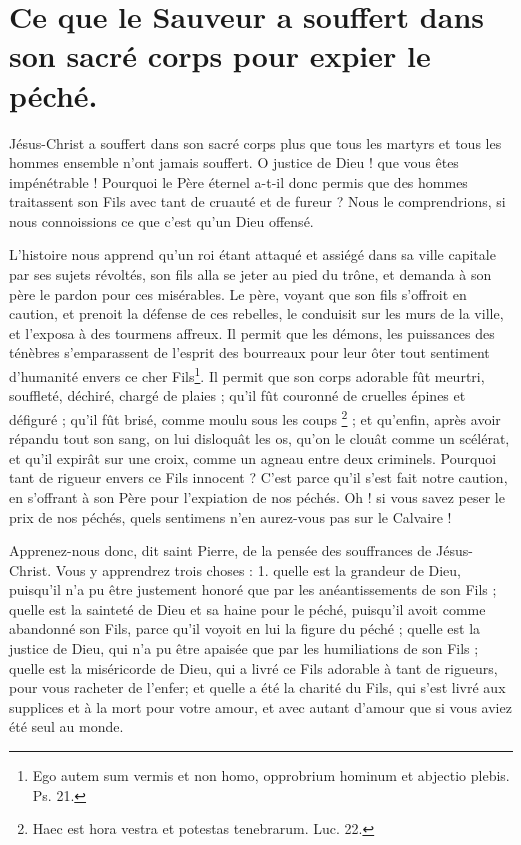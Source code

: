 \documentclass[instructions.tex]{subfiles}
\begin{document}
\chapter{Ce que le Sauveur a souffert dans son sacré corps pour expier le péché.}


Jésus-Christ a souffert dans son sacré corps plus que tous les martyrs et tous les hommes ensemble n’ont jamais souffert. O justice de Dieu ! que vous êtes impénétrable ! Pourquoi le Père éternel a-t-il donc permis que des hommes traitassent son Fils avec tant de cruauté et de fureur ? Nous le comprendrions, si nous connoissions ce que c’est qu’un Dieu offensé.

L’histoire nous apprend qu’un roi étant attaqué et assiégé dans sa ville capitale par ses sujets révoltés, son fils alla se jeter au pied du trône, et demanda à son père le pardon pour ces misérables. Le père, voyant que son fils s’offroit en caution, et prenoit la défense de ces rebelles, le conduisit sur les murs de la ville, et l’exposa à des tourmens affreux. Il permit que les démons, les puissances des ténèbres s’emparassent de l’esprit des bourreaux pour leur ôter tout sentiment d’humanité envers ce cher Fils\footnote{Ego autem sum vermis et non homo, opprobrium hominum et abjectio plebis. Ps. 21.}. Il permit que son corps adorable fût meurtri, souffleté, déchiré, chargé de plaies ; qu’il fût couronné de cruelles épines et défiguré ; qu’il fût brisé, comme moulu sous les coups \footnote{Haec est hora vestra et potestas tenebrarum. Luc. 22.} ; et qu’enfin, après avoir répandu tout son sang, on lui disloquât les os, qu’on le clouât comme un scélérat, et qu’il expirât sur une croix, comme un agneau entre deux criminels. Pourquoi tant de rigueur envers ce Fils innocent ? C’est parce qu’il s’est fait notre caution, en s’offrant à son Père pour l’expiation de nos péchés. Oh ! si vous savez peser le prix de nos péchés, quels sentimens n’en aurez-vous pas sur le Calvaire !

Apprenez-nous donc, dit saint Pierre, de la pensée des souffrances de Jésus-Christ. Vous y apprendrez trois choses : 1. quelle est la grandeur de Dieu, puisqu’il n’a pu être justement honoré que par les anéantissements de son Fils ; quelle est la sainteté de Dieu et sa haine pour le péché, puisqu’il avoit comme abandonné son Fils, parce qu’il voyoit en lui la figure du péché ; quelle est la justice de Dieu, qui n’a pu être apaisée que par les humiliations de son Fils ; quelle est la miséricorde de Dieu, qui a livré ce Fils adorable à tant de rigueurs, pour vous racheter de l’enfer; et quelle a été la charité du Fils, qui s’est livré aux supplices et à la mort pour votre amour, et avec autant d’amour que si vous aviez été seul au monde.
\end{document}
